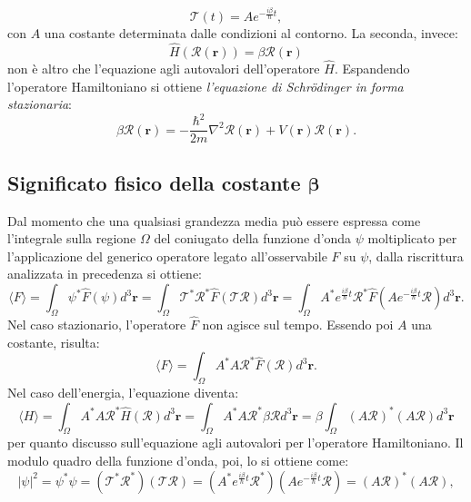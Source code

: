 \documentclass[a4paper,11pt]{report}
\begin{document}
\begin{equation}
    \mathcal{T}(t) = Ae^{-\frac{i\beta}{\hbar}t},
\end{equation}
con $A$ una costante determinata dalle condizioni al contorno. La seconda, invece:
\begin{equation}
    {\hat{H}(\mathcal{R}(\bm{r}))} = \beta{\mathcal{R}(\bm{r})}
\end{equation}
non è altro che l'equazione agli autovalori dell'operatore $\hat{H}$. Espandendo l'operatore Hamiltoniano si ottiene \textit{l'equazione di Schrödinger in forma stazionaria}:
\begin{equation}
    \beta{\mathcal{R}(\bm{r})} = -\frac{\hbar^2}{2m}\nabla^2 \mathcal{R}(\bm{r}) + V(\bm{r}) \mathcal{R}(\bm{r}).
\end{equation}

\subsection{Significato fisico della costante $\bm{\beta}$}
Dal momento che una qualsiasi grandezza media può essere espressa come l'integrale sulla regione $\Omega$ del coniugato della funzione d'onda $\psi$ moltiplicato per l'applicazione del generico operatore legato all'osservabile $F$ su $\psi$, dalla riscrittura analizzata in precedenza si ottiene:
\begin{equation}
    \langle F \rangle = \int_\Omega \psi^*\hat{F}(\psi) d^3\bm{r} = \int_\Omega \mathcal{T}^*\mathcal{R}^*\hat{F}(\mathcal{T}\mathcal{R})d^3\bm{r} = \int_\Omega A^*e^{\frac{i\beta}{\hbar}t}\mathcal{R}^*\hat{F}(Ae^{-\frac{i\beta}{\hbar}t}\mathcal{R})d^3\bm{r}.
\end{equation}
Nel caso stazionario, l'operatore $\hat{F}$ non agisce sul tempo. Essendo poi $A$ una costante, risulta:
\begin{equation}
    \langle F \rangle = \int_\Omega A^*A\mathcal{R}^*\hat{F}(\mathcal{R})d^3\bm{r}.
\end{equation}
Nel caso dell'energia, l'equazione diventa:
\begin{equation}
    \langle H \rangle = \int_\Omega A^*A\mathcal{R}^*\hat{H}(\mathcal{R})d^3\bm{r} = \int_\Omega A^*A\mathcal{R}^*\beta\mathcal{R} d^3\bm{r} = \beta \int_\Omega (A\mathcal{R})^*(A\mathcal{R}) d^3\bm{r}
\end{equation}
per quanto discusso sull'equazione agli autovalori per l'operatore Hamiltoniano. Il modulo quadro della funzione d'onda, poi, lo si ottiene come:
\begin{equation}
    |\psi|^2 = \psi^*\psi = (\mathcal{T}^*\mathcal{R}^*)(\mathcal{T}\mathcal{R}) = (A^*e^{\frac{i\beta}{\hbar}t}\mathcal{R}^*)(Ae^{-\frac{i\beta}{\hbar}t}\mathcal{R}) = (A\mathcal{R})^*(A\mathcal{R}),
\end{equation}
\end{document}
